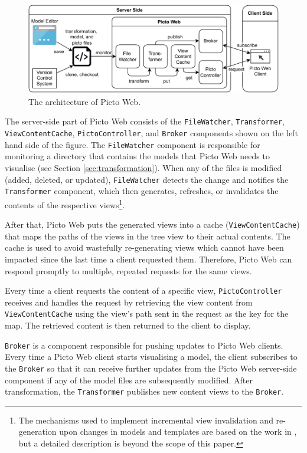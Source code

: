 \documentclass[preprint,12pt, a4paper]{elsarticle}
\begin{document}
\begin{figure}[h]
  \centering
  \includegraphics[width=\linewidth]{images/architecture.pdf}
  \caption{The architecture of Picto Web.}
  \label{fig:architecture}
\end{figure}

The server-side part of Picto Web consists of the \texttt{File\-Watch\-er}, \texttt{Trans\-form\-er}, \texttt{View\-Con\-tent\-Cache}, \texttt{Picto\-Control\-ler}, and \texttt{Broker} components shown on the left hand side of the figure. The \texttt{File\-Watcher} component is responsible for monitoring a directory that contains the models that Picto Web needs to visualise (see Section \ref{sec:transformation}). When any of the files is modified (added, deleted, or updated), \texttt{FileWatcher} detects the change and notifies the \texttt{Transformer} component, which then generates, refreshes, or invalidates the contents of the respective views\footnote{The mechanisms used to implement incremental view invalidation and re-generation upon changes in models and templates are based on the work in \cite{ogunyomi2019}, but a detailed description is beyond the scope of this paper.}.

After that, Picto Web puts the generated views into a cache (\texttt{View\-Content\-Cache}) that maps the paths of the views in the tree view to their actual contents. The cache is used to avoid wastefully re-generating views which cannot have been impacted since the last time a client requested them. Therefore, Picto Web can respond promptly to multiple, repeated requests for the same views. 

Every time a client requests the content of a specific view, \texttt{Picto\-Control\-ler} receives and handles the request by retrieving the view content from \texttt{View\-Content\-Cache} using the view's path sent in the request as the key for the map. The retrieved content is then returned to the client to display.

\texttt{Broker} is a component responsible for pushing updates to Picto Web clients. Every time a Picto Web client starts visualising a model, the client subscribes to the \texttt{Broker} so that it can receive further updates from the Picto Web server-side component if any of the model files are subsequently modified. After transformation, the \texttt{Transformer} publishes new content views to the \texttt{Broker}.
\end{document}
